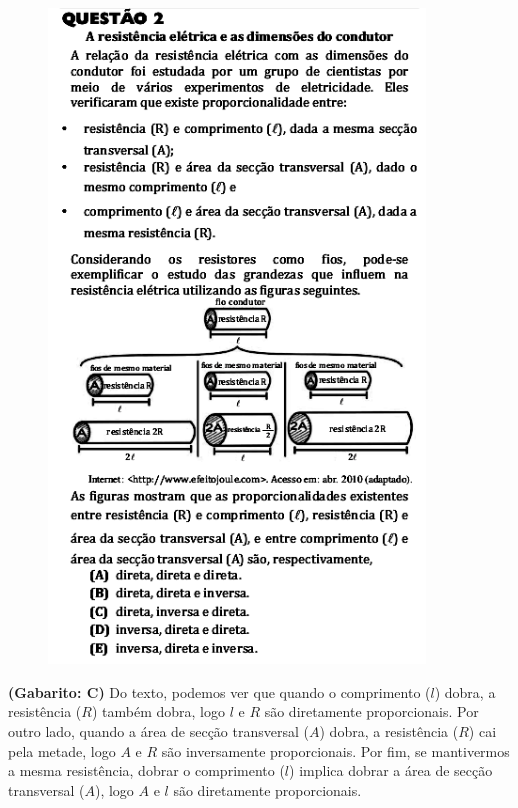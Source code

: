 \documentclass[a4paper]{article}
\begin{document}
\begin{figure}[H]
	\begin{center}
		\includegraphics[width=10cm]{L2Q2.png}
	\end{center}
\end{figure}
\par\textbf{(Gabarito: C)} Do texto, podemos ver que quando o comprimento ($l$) dobra, a resistência ($R$) também dobra, logo $l$ e $R$ são diretamente proporcionais. Por outro lado, quando a área de secção transversal ($A$) dobra, a resistência ($R$) cai pela metade, logo $A$ e $R$ são inversamente proporcionais. Por fim, se mantivermos a mesma resistência, dobrar o comprimento ($l$) implica dobrar a área de secção transversal ($A$), logo $A$ e $l$ são diretamente proporcionais.
\end{document}
